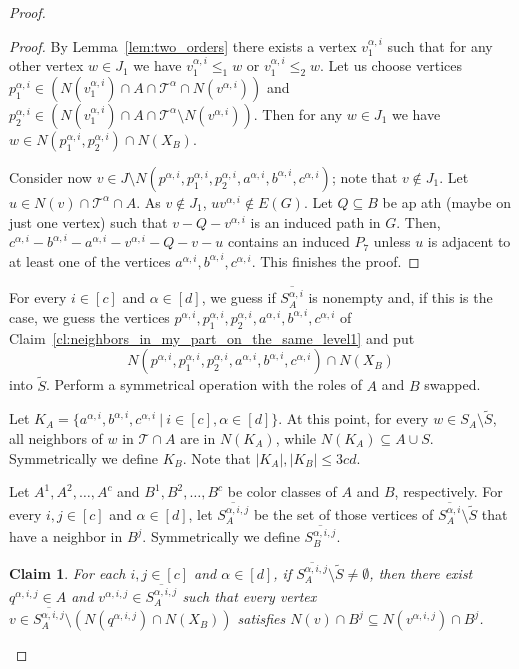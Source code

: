 \documentclass[11pt,a4paper]{article}
\newtheorem{claim}[theorem]{Claim}
\theoremstyle{definition}
\def\T{\mathcal{T}}
\begin{document}
\begin{proof}
\begin{proof}
    By Lemma~\ref{lem:two_orders} there exists a vertex $v_1^{\alpha,i}$ such that for any other vertex $w\in J_1$ we have \linebreak $v_1^{\alpha, i}\leq_1 w$ or $v_1^{\alpha,i}\leq_2 w$. 
    Let us choose vertices $p_1^{\alpha, i}\in \left(N(v_1^{\alpha, i}) \cap A\cap \T^\alpha\cap N(v^{\alpha, i})\right)$ and \linebreak $p_2^{\alpha, i}\in \left(N(v_1^{\alpha, i}) \cap A\cap \T^\alpha \setminus N(v^{\alpha, i})\right)$. Then for any $w\in J_1$ we have $w\in N(p_1^{\alpha, i}, p_2^{\alpha,i})\cap N(X_B)$. 

    Consider now $v \in J \setminus N(p^{\alpha,i},p^{\alpha,i}_1,p^{\alpha,i}_2,a^{\alpha,i},b^{\alpha,i},c^{\alpha,i})$;
    note that $v \notin J_1$.
    Let $u \in N(v) \cap \T^\alpha \cap A$. 
    As $v \notin J_1$, $uv^{\alpha,i} \notin E(G)$.
    Let $Q\subseteq B$ be ap ath (maybe on just one vertex) such that $v-Q-v^{\alpha, i}$ is an induced path in $G$. 
    Then, $c^{\alpha,i}-b^{\alpha,i}-a^{\alpha,i}-v^{\alpha,i}-Q-v-u$ contains an induced $P_7$
    unless $u$ is adjacent to at least one of the vertices $a^{\alpha,i},b^{\alpha,i},c^{\alpha,i}$. This finishes the proof.
\end{proof}

For every $i \in [c]$ and $\alpha \in [d]$, we guess if $\overline{S_A^{\alpha,i}}$ is 
nonempty and, if this is the case, we guess the vertices
$p^{\alpha,i},p_1^{\alpha,i},p_2^{\alpha,i},a^{\alpha,i},b^{\alpha,i},c^{\alpha,i}$
of Claim~\ref{cl:neighbors_in_my_part_on_the_same_level1}
and put 
\[ N(p^{\alpha,i},p_1^{\alpha,i},p_2^{\alpha,i},a^{\alpha,i},b^{\alpha,i},c^{\alpha,i}) \cap N(X_B)
\]
into $\widetilde{S}$. 
Perform a symmetrical operation with the roles of $A$ and $B$ swapped. 

Let $K_A = \{a^{\alpha,i},b^{\alpha,i},c^{\alpha,i}~|~i \in [c],\alpha \in [d]\}$. 
At this point, for every $w \in S_A \setminus \widetilde{S}$, 
all neighbors of $w$ in $\T \cap A$ are in $N(K_A)$, while $N(K_A) \subseteq A \cup S$. 
Symmetrically we define $K_B$. Note that $|K_A|,|K_B| \leq 3cd$. 

Let $A^1, A^2, \ldots, A^c$ and $B^1, B^2, \dots, B^c$ be color classes of $A$ and $B$, respectively.
For every $i,j \in [c]$ and $\alpha \in [d]$,
let $\overline{S_A^{\alpha,i,j}}$ be the set of those vertices of
$\overline{S_A^{\alpha,i}} \setminus \widetilde{S}$ that have a neighbor in $B^j$. 
Symmetrically we define $\overline{S_B^{\alpha,i,j}}$. 

\begin{claim}\label{cl:neighbors_in_my_part_on_the_same_level2}
For each $i,j\in [c]$ and $\alpha\in[d]$, if $\overline{S_A^{\alpha,i,j}} \setminus \widetilde{S} \neq \emptyset$, then there exist
$q^{\alpha,i,j} \in A$ and $v^{\alpha,i,j} \in \overline{S_A^{\alpha,i,j}}$
such that every vertex 
$v \in \overline{S_A^{\alpha, i,j}} \setminus \left(N(q^{\alpha,i,j})\cap N(X_B)\right)$
satisfies $N(v) \cap B^j \subseteq N(v^{\alpha,i,j}) \cap B^j$. 


\end{claim}
\end{proof}
\end{document}
